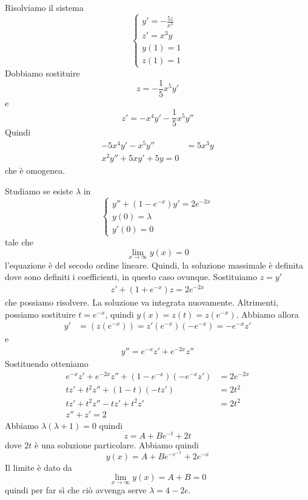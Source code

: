 \documentclass[a4paper]{article}
\begin{document}
\begin{snippetexercise}{}
    Risolviamo il sistema
    \[
        \begin{cases}
            y' = -\frac{5z}{x^5} \\
            z' = x^3y \\
            y(1) = 1 \\
            z(1) = 1
        \end{cases}
    \]
    Dobbiamo sostituire
    \[
        z = -\frac{1}{5} x^5 y'
    \]
    e
    \[
        z' = -x^4 y' - \frac{1}{5}x^5y''
    \]
    Quindi
    \begin{align*}
        -5x^4y' - x^5y'' &= 5x^3y \\
        x^2y'' + 5xy' + 5y = 0
    \end{align*}
    che è omogenea.
\end{snippetexercise}

\begin{snippetexercise}{}
    Studiamo se esiste \(\lambda\) in
    \[
        \begin{cases}
            y'' + (1 - e^{-x})y' = 2e^{-2x} \\
            y(0) = \lambda \\
            y'(0) = 0
        \end{cases}
    \]
    tale che
    \[
        \lim_{x\to\infty} y(x) = 0
    \]
    l'equazione è del secodo ordine lineare.
    Quindi, la soluzione massimale è definita dove sono definiti i coefficienti, in questo caso
    ovunque. Sostituiamo \(z = y'\)
    \begin{align*}
        z' + \left(1 + e^{-x}\right)z = 2e^{-2x}
    \end{align*}
    che possiamo risolvere. La soluzione va integrata nuovamente.
    Altrimenti, possiamo sostituire \(t = e^{-x}\), quindi \(y(x) = z(t) = z(e^{-x})\).
    Abbiamo allora
    \begin{align*}
        y' &= (z(e^{-x})) = z'(e^{-x})(-e^{-x}) = -e^{-x}z'
    \end{align*}
    e
    \begin{align*}
        y'' = e^{-x}z' + e^{-2x}z''
    \end{align*}
    Sostituendo otteniamo
    \begin{align*}
        e^{-x}z' + e^{-2x}z'' + (1-e^{-x})(-e^{-x}z') &= 2e^{-2x} \\
        tz' + t^2 z'' + (1-t)(-tz') &= 2t^2 \\
        tz' + t^2z'' - tz' + t^2z' &= 2t^2 \\
        z'' + z' = 2
    \end{align*}
    Abbiamo \(\lambda(\lambda + 1) = 0\) quindi
    \[
        z = A + Be^{-t} + 2t
    \]
    dove \(2t\) è una soluzione particolare. Abbiamo quindi
    \[
        y(x) = A + Be^{-e^{-x}} + 2e^{-x}
    \]
    Il limite è dato da
    \[
        \lim_{x\to\infty} y(x) = A+B = 0
    \]
    quindi per far sì che ciò avvenga serve \(\lambda = 4-2e\).
\end{snippetexercise}
\end{document}

